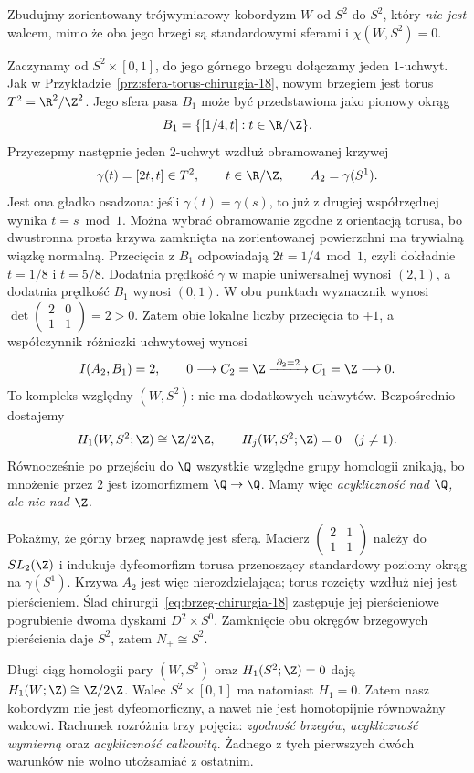 \begin{przyklad}
\label{prz:uchwyty-torsja-sfera-sfera-24}
Zbudujmy zorientowany trójwymiarowy kobordyzm
$W$ od $S^2$ do $S^2$, który \emph{nie jest} walcem,
mimo że oba jego brzegi są standardowymi sferami
i $\chi(W,S^2)=0$.

Zaczynamy od $S^2\times[0,1]$, do jego górnego
brzegu dołączamy jeden $1$-uchwyt.
Jak w Przykładzie~\ref{prz:sfera-torus-chirurgia-18},
nowym brzegiem jest torus $T^2=\R^2/\Z^2$.
Jego sfera pasa $B_1$ może być przedstawiona
jako pionowy okrąg
\[
 B_1=\{[1/4,t]:t\in\R/\Z\}.
\]
Przyczepmy następnie jeden $2$-uchwyt
wzdłuż obramowanej krzywej
\[
 \gamma(t)=[2t,t]\in T^2,\qquad t\in\R/\Z,
 \qquad A_2=\gamma(S^1).
\]
Jest ona gładko osadzona: jeśli
$\gamma(t)=\gamma(s)$, to już z drugiej
współrzędnej wynika $t=s\bmod1$.
Można wybrać obramowanie zgodne z orientacją torusa,
bo dwustronna prosta krzywa zamknięta na zorientowanej
powierzchni ma trywialną wiązkę normalną.
Przecięcia z $B_1$ odpowiadają
$2t=1/4\bmod1$, czyli dokładnie
$t=1/8$ i $t=5/8$.
Dodatnia prędkość $\gamma$ w mapie uniwersalnej wynosi
$(2,1)$, a dodatnia prędkość $B_1$ wynosi $(0,1)$.
W obu punktach wyznacznik wynosi
$\det\left(\begin{smallmatrix}2&0\\1&1\end{smallmatrix}\right)=2>0$.
Zatem obie lokalne liczby przecięcia to $+1$,
a współczynnik różniczki uchwytowej wynosi
\[
 I(A_2,B_1)=2,\qquad
 0\longrightarrow C_2=\Z
 \xrightarrow{\ \partial_2=2\ } C_1=\Z
 \longrightarrow0.
\]
To kompleks względny $(W,S^2)$:
nie ma dodatkowych uchwytów.
Bezpośrednio dostajemy
\[
 H_1(W,S^2;\Z)\cong\Z/2\Z,\qquad
 H_j(W,S^2;\Z)=0\quad(j\ne1).
\]
Równocześnie po przejściu do $\Q$
wszystkie względne grupy homologii znikają,
bo mnożenie przez $2$ jest izomorfizmem $\Q\to\Q$.
Mamy więc \emph{acykliczność nad $\Q$, ale nie nad $\Z$}.

Pokażmy, że górny brzeg naprawdę jest sferą.
Macierz
$\left(\begin{smallmatrix}2&1\\1&1\end{smallmatrix}\right)$
należy do $SL_2(\Z)$ i indukuje dyfeomorfizm torusa
przenoszący standardowy poziomy okrąg
na $\gamma(S^1)$.
Krzywa $A_2$ jest więc nierozdzielająca;
torus rozcięty wzdłuż niej jest pierścieniem.
Ślad chirurgii~\eqref{eq:brzeg-chirurgia-18}
zastępuje jej pierścieniowe pogrubienie
dwoma dyskami $D^2\times S^0$.
Zamknięcie obu okręgów brzegowych pierścienia
daje $S^2$, zatem $N_+\cong S^2$.

Długi ciąg homologii pary $(W,S^2)$ oraz
$H_1(S^2;\Z)=0$ dają
$H_1(W;\Z)\cong\Z/2\Z$.
Walec $S^2\times[0,1]$ ma natomiast
$H_1=0$. Zatem nasz kobordyzm nie jest
dyfeomorficzny, a nawet nie jest homotopijnie
równoważny walcowi.
Rachunek rozróżnia trzy pojęcia:
\emph{zgodność brzegów}, \emph{acykliczność wymierną}
oraz \emph{acykliczność całkowitą}.
Żadnego z tych pierwszych dwóch warunków
nie wolno utożsamiać z ostatnim.
\end{przyklad}

